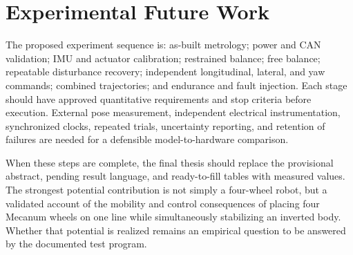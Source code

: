 \section{Experimental Future Work}\label{experimental-future-work}

The proposed experiment sequence is: as-built metrology; power and CAN
validation; IMU and actuator calibration; restrained balance; free
balance; repeatable disturbance recovery; independent longitudinal,
lateral, and yaw commands; combined trajectories; and endurance and
fault injection. Each stage should have approved quantitative
requirements and stop criteria before execution. External pose
measurement, independent electrical instrumentation, synchronized
clocks, repeated trials, uncertainty reporting, and retention of
failures are needed for a defensible model-to-hardware comparison.

When these steps are complete, the final thesis should replace the
provisional abstract, pending result language, and ready-to-fill tables
with measured values. The strongest potential contribution is not simply
a four-wheel robot, but a validated account of the mobility and control
consequences of placing four Mecanum wheels on one line while
simultaneously stabilizing an inverted body. Whether that potential is
realized remains an empirical question to be answered by the documented
test program.
